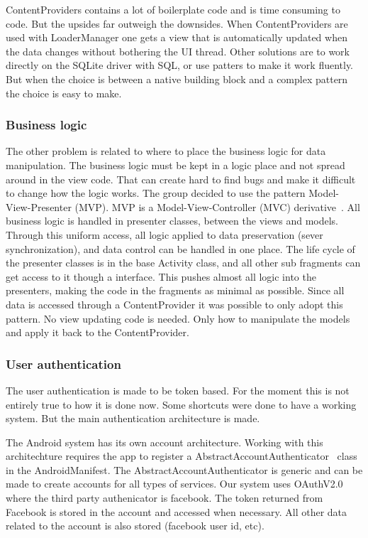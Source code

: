 ContentProviders contains a lot of boilerplate code and is time consuming to code. But the upsides far outweigh the downsides. When ContentProviders are used with LoaderManager one gets a view that is automatically updated when the data changes without bothering the UI thread. Other solutions are to work directly on the SQLite driver with SQL, or use patters to make it work fluently. But when the choice is between a native building block and a complex pattern the choice is easy to make. 

\subsubsection{Business logic}

The other problem is related to where to place the business logic for data manipulation. The business logic must be kept in a logic place and not spread around in the view code. That can create hard to find bugs and make it difficult to change how the logic works.
The group decided to use the pattern Model-View-Presenter (MVP). MVP is a Model-View-Controller (MVC) derivative~\cite{mvc}. All business logic is handled in presenter classes, between the views and models. Through this uniform access, all logic applied to data preservation (sever synchronization), and data control can be handled in one place. The life cycle of the presenter classes is in the base Activity class, and all other sub fragments can get access to it though a interface. 
This pushes almost all logic into the presenters, making the code in the fragments as minimal as possible. Since all data is accessed through a ContentProvider it was possible to only adopt this pattern. No view updating code is needed. Only how to manipulate the models and apply it back to the ContentProvider.


\subsubsection{User authentication}

The user authentication is made to be token based. For the moment this is not entirely true to how it is done now. Some shortcuts were done to have a working system. But the main authentication architecture is made.

The Android system has its own account architecture. Working with this architechture requires the app to register a AbstractAccountAuthenticator~\cite{androidAccount} class in the AndroidManifest. The AbstractAccountAuthenticator is generic and can be made to create accounts for all types of services. Our system uses OAuthV2.0 where the third party authenicator is facebook. The token returned from Facebook is stored in the account and accessed when necessary. All other data related to the account is also stored (facebook user id, etc).

